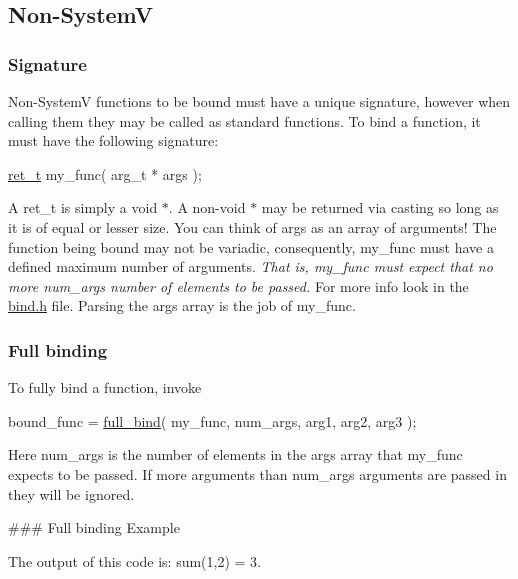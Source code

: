 \subsection*{Non-\/\+SystemV}

\subsubsection*{Signature}

Non-\/\+SystemV functions to be bound must have a unique signature, however when calling them they may be called as standard functions. To bind a function, it must have the following signature\+: 
\begin{DoxyCode}
\hyperlink{bind_8h_a54aeeb54a7a6a62c72ec8dc7718fdd91}{ret\_t} my\_func( arg\_t * args );
\end{DoxyCode}
 A {\ttfamily ret\+\_\+t} is simply a {\ttfamily void $\ast$}. A non-\/{\ttfamily void $\ast$} may be returned via casting so long as it is of equal or lesser size. You can think of {\ttfamily args} as an array of arguments! The function being bound may not be variadic, consequently, {\ttfamily my\+\_\+func} must have a defined maximum number of \textquotesingle{}arguments\textquotesingle{}. {\itshape That is, {\ttfamily my\+\_\+func} must expect that no more {\ttfamily num\+\_\+args} number of elements to be passed.} For more info look in the {\ttfamily \hyperlink{bind_8h}{bind.\+h}} file. Parsing the {\ttfamily args} array is the job of {\ttfamily my\+\_\+func}.

\subsubsection*{Full binding}

To fully bind a function, invoke 
\begin{DoxyCode}
bound\_func = \hyperlink{bind_8c_a31fdc3dfcbd70d3f32f4e3c8a2084c6a}{full\_bind}( my\_func, num\_args, arg1, arg2, arg3 );
\end{DoxyCode}
 Here {\ttfamily num\+\_\+args} is the number of elements in the {\ttfamily args} array that {\ttfamily my\+\_\+func} expects to be passed. If more arguments than {\ttfamily num\+\_\+args} arguments are passed in they will be ignored.

\#\#\# Full binding Example 
 The output of this code is\+: {\ttfamily sum(1,2) = 3}.

